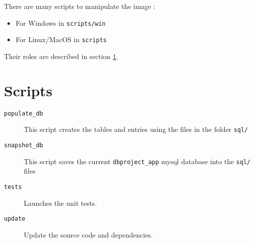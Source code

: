 \documentclass[twoside,a4paper,12pt]{article}
\begin{document}
There are many scripts to manipulate the image :
\begin{itemize}
	\item For Windows in \texttt{scripts/win}
	\item For Linux/MacOS in \texttt{scripts}
\end{itemize}

Their roles are described in section \ref{sec:scripts}. 
\newpage
\section{Scripts}
\label{sec:scripts}

\begin{description}
	\item[\texttt{populate\_db}] This script creates the tables and entries using the files in the folder \texttt{sql/}
	\item[\texttt{snapshot\_db}] This script saves the current \texttt{dbproject\_app} mysql database into the \texttt{sql/} files
	\item[\texttt{tests}] Launches the unit tests.
	\item[\texttt{update}] Update the source code and dependencies.
\end{description}
\end{document}
